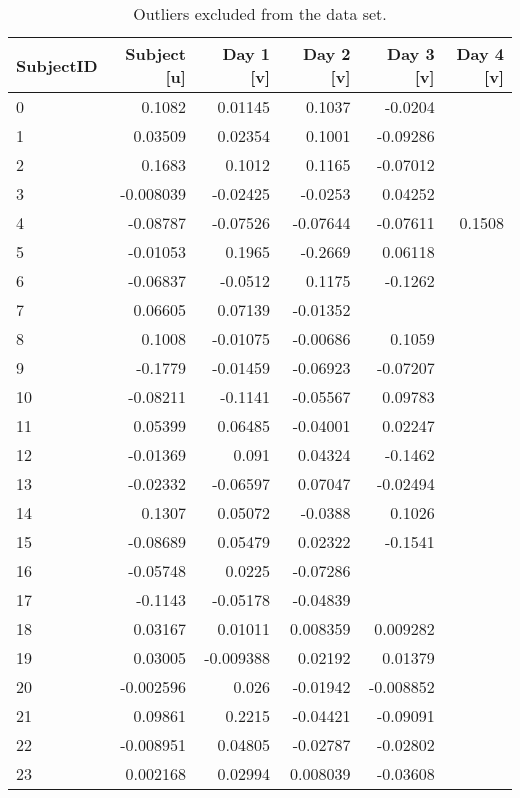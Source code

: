\begin{table}[ht]
\centering
\caption{Outliers excluded from the data set.} 
\label{tab:uv_table}
\begin{tabular}{lrrrrr}
  \hline
SubjectID & Subject [u] & Day 1 [v] & Day 2 [v] & Day 3 [v] & Day 4 [v] \\ 
  \hline
\hline
0 & 0.1082 & 0.01145 & 0.1037 & -0.0204 &  \\ 
  1 & 0.03509 & 0.02354 & 0.1001 & -0.09286 &  \\ 
  2 & 0.1683 & 0.1012 & 0.1165 & -0.07012 &  \\ 
  3 & -0.008039 & -0.02425 & -0.0253 & 0.04252 &  \\ 
  4 & -0.08787 & -0.07526 & -0.07644 & -0.07611 & 0.1508 \\ 
  5 & -0.01053 & 0.1965 & -0.2669 & 0.06118 &  \\ 
  6 & -0.06837 & -0.0512 & 0.1175 & -0.1262 &  \\ 
  7 & 0.06605 & 0.07139 & -0.01352 &  &  \\ 
  8 & 0.1008 & -0.01075 & -0.00686 & 0.1059 &  \\ 
  9 & -0.1779 & -0.01459 & -0.06923 & -0.07207 &  \\ 
  10 & -0.08211 & -0.1141 & -0.05567 & 0.09783 &  \\ 
  11 & 0.05399 & 0.06485 & -0.04001 & 0.02247 &  \\ 
  12 & -0.01369 & 0.091 & 0.04324 & -0.1462 &  \\ 
  13 & -0.02332 & -0.06597 & 0.07047 & -0.02494 &  \\ 
  14 & 0.1307 & 0.05072 & -0.0388 & 0.1026 &  \\ 
  15 & -0.08689 & 0.05479 & 0.02322 & -0.1541 &  \\ 
  16 & -0.05748 & 0.0225 & -0.07286 &  &  \\ 
  17 & -0.1143 & -0.05178 & -0.04839 &  &  \\ 
  18 & 0.03167 & 0.01011 & 0.008359 & 0.009282 &  \\ 
  19 & 0.03005 & -0.009388 & 0.02192 & 0.01379 &  \\ 
  20 & -0.002596 & 0.026 & -0.01942 & -0.008852 &  \\ 
  21 & 0.09861 & 0.2215 & -0.04421 & -0.09091 &  \\ 
  22 & -0.008951 & 0.04805 & -0.02787 & -0.02802 &  \\ 
  23 & 0.002168 & 0.02994 & 0.008039 & -0.03608 &  \\ 

\end{tabular}
\end{table}
